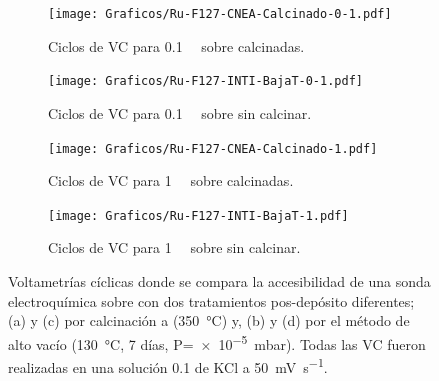 	  		\begin{figure}[bt!]
		 	
		 	\begin{subfigure}[t]{0.5\textwidth}
		          	\texttt{[image: Graficos/Ru-F127-CNEA-Calcinado-0-1.pdf]}
		          	\vspace*{-6mm}
		         	\caption{Ciclos de VC para \ru\space \SI{0.1}{\milli\Molar} sobre \pdmF\space calcinadas.}
		          	\vspace*{3mm}
		          	\label{fig:cal_01mM}
		          	\end{subfigure}
		    \begin{subfigure}[t]{0.5\textwidth}
		          	\texttt{[image: Graficos/Ru-F127-INTI-BajaT-0-1.pdf]}
		         	\vspace*{-6mm}
		         	\caption{Ciclos de VC para \ru\space \SI{0.1}{\milli\Molar} sobre \pdmF\space sin calcinar.}
		      		\vspace*{3mm}
		      		\label{fig:vac_01mM}
		      		\end{subfigure}
		    \begin{subfigure}[t]{0.5\textwidth}
		          	\texttt{[image: Graficos/Ru-F127-CNEA-Calcinado-1.pdf]}
		         	\vspace*{-6mm}
		         	\caption{Ciclos de VC para \ru\space \SI{1}{\milli\Molar} sobre \pdmF\space calcinadas.}
		            \vspace*{3mm}
		            \label{fig:cal_1mM}
		            \end{subfigure}
		    \begin{subfigure}[t]{0.5\textwidth}
		          	\texttt{[image: Graficos/Ru-F127-INTI-BajaT-1.pdf]}
		         	\vspace*{-6mm}
		         	\caption{Ciclos de VC para \ru\space \SI{1}{\milli\Molar} sobre \pdmF\space sin calcinar.}
		    		\vspace*{3mm}
		    		\label{fig:vac_1mM}
		    		\end{subfigure}
		      	 	\caption[Voltagrama comparativo SF calcinados/alto vacío I]{Voltametrías cíclicas donde se compara la accesibilidad de una sonda electroquímica sobre \pdmF\space con dos tratamientos pos-depósito diferentes; (a) y (c) por calcinación a (\SI{350}{\celsius}) y, (b) y (d) por el método de alto vacío (\SI{130}{\celsius}, 7 días, P=\SI{e-5}{\milli\bar}). Todas las VC fueron realizadas en una solución \SI{0.1}{\Molar} de KCl a \SI{50}{\milli\volt\per\second}.}
		      		\label{fig:comp-calc-vacio}
	      \end{figure}

